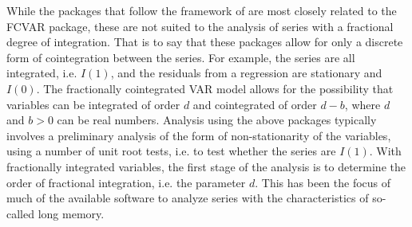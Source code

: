 \documentclass[11pt,letterpaper]{paper}
\newcommand{\pkg}[1]{{\normalfont\fontseries{b}\selectfont #1}}
\begin{document}

While the packages that follow the framework of \citet{Johansen1995} are most closely related to the \pkg{FCVAR} package, these are not suited to the analysis of series with a fractional degree of integration. 
That is to say that these packages allow for only a discrete form of cointegration between the series. 
For example, the series are all integrated, i.e. $I(1)$, and the residuals from a regression are stationary and $I(0)$. 
The fractionally cointegrated VAR model allows for the possibility that variables can be integrated of order $d$ and cointegrated of order $d - b$, where $d$ and $b>0$ can be real numbers. 
% 
Analysis using the above packages typically involves a preliminary analysis of the form of non-stationarity of the variables, using a number of unit root tests, i.e. to test whether the series are $I(1)$. 
With fractionally integrated variables, the first stage of the analysis is to determine the order of fractional integration, i.e. the parameter $d$. 
This has been the focus of much of the available software to analyze series with the characteristics of so-called long memory. 




\end{document}
